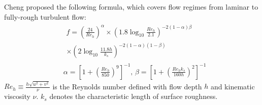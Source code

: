 \subsubsection{\cite{cheng_formulas_2008}}

Cheng proposed the following formula, which covers flow regimes from laminar to fully-rough turbulent flow:
\begin{equation}
    \begin{split}
        &\begin{multlined}
            f =
            \left( \frac{24}{Re_h} \right)^\alpha
            \times
            \left( 1.8\log_{10}\frac{Re_h}{2.1} \right)^{-2\left(1-\alpha\right)\beta}
            \\
            \times
            \left( 2\log_{10}\frac{11.8h}{k_s} \right)^{-2\left(1-\alpha\right)\left(1-\beta\right)}
        \end{multlined}\\
        &\alpha=\left[1+\left(\frac{Re_h}{850}\right)^9\right]^{-1}
        \text{, }
        \beta=\left[1+\left(\frac{Re_h k_s}{160h}\right)^2\right]^{-1}
    \end{split}
\end{equation}
$Re_h\equiv\frac{h\sqrt{u^2+v^2}}{\nu}$ is the Reynolds number defined with flow depth $h$ and kinematic viscosity $\nu$.
$k_s$ denotes the characteristic length of surface roughness. 

\subsubsection{\cite{bellos_friction_2018}}

